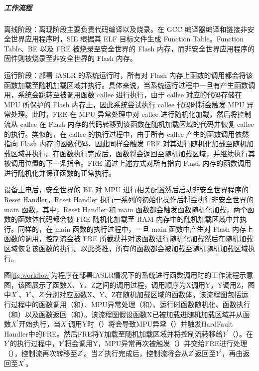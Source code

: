 \documentclass[UTF8,12pt,a4paper]{ctexart}
\numberwithin{figure}{section}
\begin{document}
\subparagraph{工作流程}
\par 离线阶段：离现阶段主要负责代码编译以及烧录。在 GCC 编译器编译和链接非安全世界应用程序时，SIE 根据其 ELF 目标文件生成 Function Table。Function Table、BE 以及 FRE 被烧录至安全世界的 Flash 内存，而非安全世界应用程序的固件则被烧录至非安全世界的 Flash 内存。
\par 运行阶段：部署 fASLR 的系统运行时，所有对 Flash 内存上函数的调用都会将该函数加载至随机加载区域并执行。具体来说，当系统运行过程中一旦有产生函数调用，系统会跳转至被调用函数 callee 进行执行，由于 callee 对应的代码存储在 MPU 所保护的 Flash 内存上，因此系统尝试执行 callee 代码时将会触发 MPU 异常处理。此时，FRE 在 MPU 异常处理中对 callee 进行随机化加载，然后将控制流从 callee 在 Flash 内存的代码转移到该函数在随机加载区域的代码并恢复 callee 的执行。类似的，在 callee 的执行过程中，由于所有 callee 产生的函数调用依然指向 Flash 内存的函数代码，因此同样会触发 FRE 对其进行随机化加载至随机加载区域并执行。在函数执行完成后，函数将会返回至随机加载区域，并继续执行其被调用位置的下一条指令。FRE 通过上述方式对所有指向 Flash 内存的函数调用进行随机化并保证函数的正常执行。
\par 设备上电后，安全世界的 BE 对 MPU 进行相关配置然后启动非安全世界程序的 Reset Handler。Reset Handler 执行一系列的初始化操作后将会执行非安全世界的 main 函数，其中，Reset Handler 和 main 函数都会触发函数随机化加载，两个函数的函数体代码都会被 FRE 随机化加载至 RAM 内存中的随机加载区域中并执行。同样的，在 main 函数的执行过程中，一旦 main 函数中产生对 Flash 内存上函数的调用，控制流会被 FRE 所截获并对该函数进行随机化加载然后在随机加载区域恢复该函数的执行。以此类推，所有的函数都会被加载至随机随机加载区域执行。
\par 图\ref{fig:workflow}为程序在部署fASLR情况下的系统进行函数调用时的工作流程示意图，该图展示了函数X、Y、Z之间的调用过程，调用顺序为X调用Y，Y调用Z，图中$X^{'}、Y^{'}、Z^{'}$分别对应函数X、Y、Z在随机加载区域的函数体。该流程图包括运行过程中的函数调用（和）、MPU异常处理（和）、运行时函数随机化、函数执行（和）以及函数返回（和）。该流程图假设函数X已被加载进随机加载区域并从函数$X^{'}$开始执行，当$X^{'}$调用Y时（）将会导致MPU异常（）并触发HardFault Handler中的FRE。然后FRE将Y加载至随机加载区域并将控制流转移给$Y^{'}$（）。在$Y^{'}$的执行过程中，$Y^{'}$将会调用Y，MPU异常再次被触发（）并交给FRE进行处理（），控制流再次转移至$Z^{'}$。当$Z^{'}$执行完成后，控制流将会从$Z^{'}$返回至$Y^{'}$，再由返回至$X^{'}$。
\end{document}
